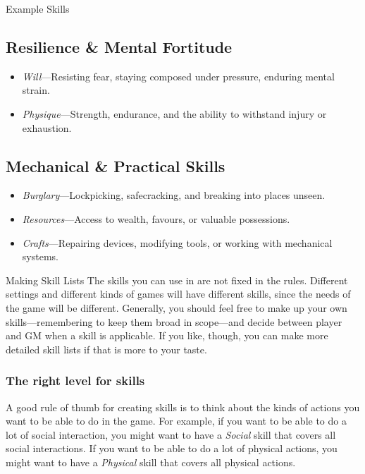 \begin{multicols}{2}
\begin{CommentBox}{Example Skills}
			\subsection*{Resilience \& Mental Fortitude}  
			\begin{itemize}
				\item \emph{Will}---Resisting fear, staying composed under pressure, enduring mental strain.
				\item \emph{Physique}---Strength, endurance, and the ability to withstand injury or exhaustion.
			\end{itemize}
	
			\subsection*{Mechanical \& Practical Skills}  
			\begin{itemize}
				\item \emph{Burglary}---Lockpicking, safecracking, and breaking into places unseen.
				\item \emph{Resources}---Access to wealth, favours, or valuable possessions.
				\item \emph{Crafts}---Repairing devices, modifying tools, or working with mechanical systems.
			\end{itemize}
	\end{CommentBox}


	\begin{CommentBox}{Making Skill Lists}
		The skills you can use in \wyrd are not fixed in the rules. Different settings and different kinds of games will have different skills, since the needs of the game will be different. Generally, you should feel free to make up your own skills---remembering to keep them broad in scope---and decide between player and GM when a skill is applicable. If you like, though, you can make more detailed skill lists if that is more to your taste.

		\subsubsection*{The right level for skills}
		A good rule of thumb for creating skills is to think about the kinds of actions you want to be able to do in the game. For example, if you want to be able to do a lot of social interaction, you might want to have a \emph{Social} skill that covers all social interactions. If you want to be able to do a lot of physical actions, you might want to have a \emph{Physical} skill that covers all physical actions.


\end{CommentBox}
\end{multicols}
